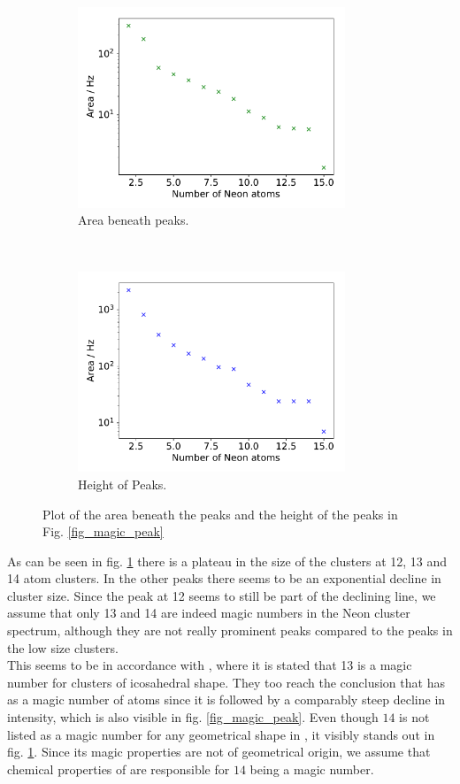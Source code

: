 \documentclass[a4paper,10pt]{article}
\begin{document}
\begin{figure}[H]
  \centering{}
  \begin{subfigure}[t]{0.45 \textwidth}
    \centering
    \includegraphics[height=6cm]{magic_area.pdf}
    \caption{Area beneath peaks.}
  \end{subfigure}
  ~
  \begin{subfigure}[t]{0.45 \textwidth}
    \centering
    \includegraphics[height=6cm]{magic_height.pdf}
    \caption{Height of Peaks. }
  \end{subfigure}
  \caption{Plot of the area beneath the peaks and the height of the peaks in Fig. \ref{fig_magic_peak}}
  \label{fig_magic_simple}
\end{figure}
As can be seen in fig. \ref{fig_magic_simple} there is a plateau in the size of the clusters at 12, 13 and 14 atom clusters. In the other peaks there seems to be an exponential decline in cluster size. Since the peak at 12 seems to still be part of the declining line, we assume that only 13 and 14 are indeed magic numbers in the Neon cluster spectrum, although they are not really prominent peaks compared to the peaks in the low size clusters. \\
This seems to be in accordance with \cite{paper_scheier}, where it is stated that 13 is a magic number for clusters of icosahedral shape. They too reach the conclusion that  has as a magic number of atoms since it is followed by a comparably steep decline in intensity, which is also visible in fig. \ref{fig_magic_peak}. Even though $14$ is not listed as a magic number for any geometrical shape in \cite{bergmann}, it visibly stands out in fig. \ref{fig_magic_simple}. Since its magic properties are not of geometrical origin, we assume that chemical properties of  are responsible for $14$ being a magic number.
\end{document}
